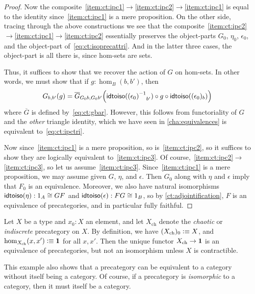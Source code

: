 \documentclass[hott-all.tex]{subfiles}
\begin{document}
\begin{proof}
  Now the composite~\ref{item:ct:ipc1}$\to$\ref{item:ct:ipc2}$\to$\ref{item:ct:ipc1} is equal to the identity since~\ref{item:ct:ipc1} is a mere proposition.
  On the other side, tracing through the above constructions we see that the composite~\ref{item:ct:ipc2}$\to$\ref{item:ct:ipc1}$\to$\ref{item:ct:ipc2} essentially preserves the object-parts $G_0$, $\eta_0$, $\epsilon_0$, and the object-part of~\eqref{eq:ct:isoprecattri}.
  And in the latter three cases, the object-part is all there is, since hom-sets are sets.

  Thus, it suffices to show that we recover the action of $G$ on hom-sets.
  In other words, we must show that if $g:\hom_B(b,b')$, then
  \[ G_{b,b'}(g) =
  \overline{G}_{G_0b,G_0b'}\Big(\mathsf{idtoiso}(\mathord{{(\epsilon_0)}^{-1}}_{b'}) \circ g \circ \mathsf{idtoiso}((\epsilon_0)_b)\Big)
  \]
  where $\overline{G}$ is defined by~\eqref{eq:ct:gbar}.
  However, this follows from functoriality of $G$ and the \emph{other} triangle identity, which we have seen in \cref{cha:equivalences} is equivalent to~\eqref{eq:ct:ipctri}.

  Now since~\ref{item:ct:ipc1} is a mere proposition, so is~\ref{item:ct:ipc2}, so it suffices to show they are logically equivalent to~\ref{item:ct:ipc3}.
  Of course,~\ref{item:ct:ipc2}$\to$\ref{item:ct:ipc3}, so let us assume~\ref{item:ct:ipc3}.
  Since~\ref{item:ct:ipc1} is a mere proposition, we may assume given $G$, $\eta$, and $\epsilon$.
  Then $G_0$ along with $\eta$ and $\epsilon$ imply that $F_0$ is an equivalence.
  Moreover, we also have natural isomorphisms $\mathsf{idtoiso}(\eta):1_A\cong GF$ and $\mathsf{idtoiso}(\epsilon):FG\cong 1_B$, so by \cref{ct:adjointification}, $F$ is an equivalence of precategories, and in particular fully faithful.
\end{proof}


\begin{eg}
  Let $X$ be a type and $x_0:X$ an element, and let $X_{\mathrm{ch}}$ denote the \emph{chaotic} or \emph{indiscrete} precategory on $X$.
  By definition, we have $(X_{\mathrm{ch}})_0\vcentcolon\equiv X$, and $\hom_{X_{\mathrm{ch}}}(x,x') \vcentcolon\equiv \mathbf{1}$ for all $x,x'$.
  Then the unique functor $X_{\mathrm{ch}}\to \mathbf{1}$ is an equivalence of precategories, but not an isomorphism unless $X$ is contractible.

  This example also shows that a precategory can be equivalent to a category without itself being a category.
  Of course, if a precategory is \emph{isomorphic} to a category, then it must itself be a category.
\end{eg}
\end{document}
